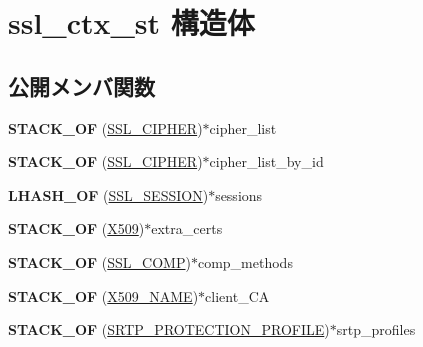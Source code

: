 \hypertarget{structssl__ctx__st}{}\section{ssl\+\_\+ctx\+\_\+st 構造体}
\label{structssl__ctx__st}
\subsection*{公開メンバ関数}
\begin{DoxyCompactItemize}
\item 
\hypertarget{structssl__ctx__st_aeae48802a98db69348bba2b610fd5c0c}{}{\bfseries S\+T\+A\+C\+K\+\_\+\+O\+F} (\hyperlink{structssl__cipher__st}{S\+S\+L\+\_\+\+C\+I\+P\+H\+E\+R})$\ast$cipher\+\_\+list\label{structssl__ctx__st_aeae48802a98db69348bba2b610fd5c0c}

\item 
\hypertarget{structssl__ctx__st_aea9ca79cf751419a511ce4f171fd9064}{}{\bfseries S\+T\+A\+C\+K\+\_\+\+O\+F} (\hyperlink{structssl__cipher__st}{S\+S\+L\+\_\+\+C\+I\+P\+H\+E\+R})$\ast$cipher\+\_\+list\+\_\+by\+\_\+id\label{structssl__ctx__st_aea9ca79cf751419a511ce4f171fd9064}

\item 
\hypertarget{structssl__ctx__st_a31f304395cbaf8bdbf2eae3693f3d0f4}{}{\bfseries L\+H\+A\+S\+H\+\_\+\+O\+F} (\hyperlink{structssl__session__st}{S\+S\+L\+\_\+\+S\+E\+S\+S\+I\+O\+N})$\ast$sessions\label{structssl__ctx__st_a31f304395cbaf8bdbf2eae3693f3d0f4}

\item 
\hypertarget{structssl__ctx__st_aeb590bc7c9be569fa3d60563763c8fca}{}{\bfseries S\+T\+A\+C\+K\+\_\+\+O\+F} (\hyperlink{structx509__st}{X509})$\ast$extra\+\_\+certs\label{structssl__ctx__st_aeb590bc7c9be569fa3d60563763c8fca}

\item 
\hypertarget{structssl__ctx__st_ade6674ea4627c2c5ad756c112d6ff389}{}{\bfseries S\+T\+A\+C\+K\+\_\+\+O\+F} (\hyperlink{structssl__comp__st}{S\+S\+L\+\_\+\+C\+O\+M\+P})$\ast$comp\+\_\+methods\label{structssl__ctx__st_ade6674ea4627c2c5ad756c112d6ff389}

\item 
\hypertarget{structssl__ctx__st_aa1061d7d0405217fb37a7d822716e92a}{}{\bfseries S\+T\+A\+C\+K\+\_\+\+O\+F} (\hyperlink{struct_x509__name__st}{X509\+\_\+\+N\+A\+M\+E})$\ast$client\+\_\+\+C\+A\label{structssl__ctx__st_aa1061d7d0405217fb37a7d822716e92a}

\item 
\hypertarget{structssl__ctx__st_abe263c734b3b85b909a6a0accef3a66f}{}{\bfseries S\+T\+A\+C\+K\+\_\+\+O\+F} (\hyperlink{structsrtp__protection__profile__st}{S\+R\+T\+P\+\_\+\+P\+R\+O\+T\+E\+C\+T\+I\+O\+N\+\_\+\+P\+R\+O\+F\+I\+L\+E})$\ast$srtp\+\_\+profiles\label{structssl__ctx__st_abe263c734b3b85b909a6a0accef3a66f}

\end{DoxyCompactItemize}

